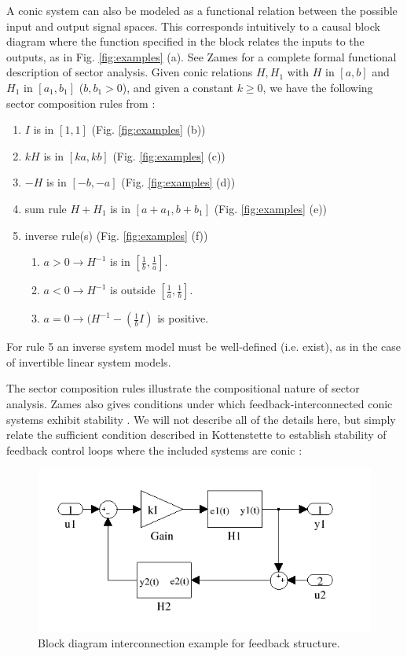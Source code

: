 A conic system can also be modeled as a functional relation between the possible input and output
signal spaces.  This corresponds intuitively to a causal block diagram where the function
specified in the block relates the inputs to the outputs, as in Fig. \ref{fig:examples} (a). 
See Zames for a complete formal functional description of sector analysis.
Given conic relations $H, H_1$ with $H$ in $[a,b]$ and $H_1$ in $[a_1, b_1]$ ($b, b_1 > 0$),
and given a constant $k \geq 0$,  we have the following sector composition rules from 
\cite{control:sectors1}:

\begin{enumerate}
\item $I$ is in $[1,1]$ (Fig. \ref{fig:examples} (b))
\item $kH$ is in $[ka, kb]$ (Fig. \ref{fig:examples} (c))
\item $-H$ is in $[-b, -a]$ (Fig. \ref{fig:examples} (d))
\item sum rule $H+H_1$ is in $[a+a_1, b+b_1]$ (Fig. \ref{fig:examples} (e))
\item inverse rule(s) (Fig. \ref{fig:examples} (f))
\begin{enumerate}
 \item $a > 0 \rightarrow H^{-1}$ is in $[\frac{1}{b},\frac{1}{a}]$.
 \item $a < 0 \rightarrow H^{-1}$ is outside $[\frac{1}{a},\frac{1}{b}]$.
 \item $a = 0 \rightarrow (H^{-1} - (\frac{1}{b}I)$ is positive.
\end{enumerate}
\end{enumerate}

For rule 5 an inverse system model must be well-defined (i.e. exist), as in the case of 
invertible linear system models.

The sector composition rules illustrate the compositional nature of sector analysis. Zames 
also gives conditions under which feedback-interconnected conic systems exhibit
stability \cite[Theorems 2a,2b]{control:sectors1}.  We will not describe all of the 
details here, but simply relate the sufficient condition described in Kottenstette
to establish stability of feedback control loops where the included systems are conic
\cite[Corollary 2]{quad:passcontrol}:

\begin{figure}[htb]
\centering
\includegraphics[width=0.95\columnwidth]{figures/fback_example}
    \caption{Block diagram interconnection example for feedback structure.}
    \label{fig:fback_example}
\end{figure}

